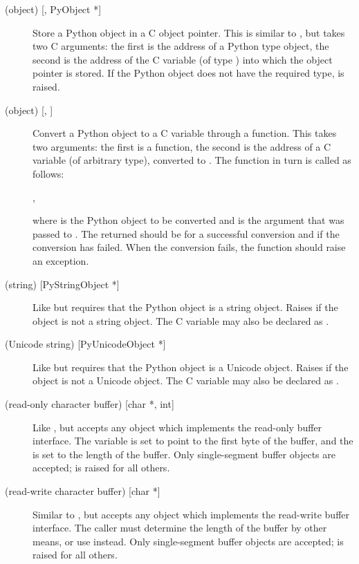 \begin{description}
\item[ (object) {[, PyObject *]}]
Store a Python object in a C object pointer.  This is similar to
, but takes two C arguments: the first is the address of a
Python type object, the second is the address of the C variable (of
type ) into which the object pointer is stored.
If the Python object does not have the required type,
 is raised.

\item[ (object) {[, ]}]
Convert a Python object to a C variable through a 
function.  This takes two arguments: the first is a function, the
second is the address of a C variable (of arbitrary type), converted
to .  The  function in turn is called as
follows:

\code{ = }\code{(}, \code{);}

where  is the Python object to be converted and
 is the  argument that was passed to
.  The returned  should be
 for a successful conversion and  if the conversion
has failed.  When the conversion fails, the  function
should raise an exception.

\item[ (string) {[PyStringObject *]}]
Like  but requires that the Python object is a string object.
Raises  if the object is not a string object.
The C variable may also be declared as .

\item[ (Unicode string) {[PyUnicodeObject *]}]
Like  but requires that the Python object is a Unicode object.
Raises  if the object is not a Unicode object.
The C variable may also be declared as .

\item[ (read-only character buffer) {[char *, int]}]
Like , but accepts any object which implements the read-only 
buffer interface.  The  variable is set to point to the
first byte of the buffer, and the  is set to the length of
the buffer.  Only single-segment buffer objects are accepted;
 is raised for all others.

\item[ (read-write character buffer) {[char *]}]
Similar to , but accepts any object which implements the
read-write buffer interface.  The caller must determine the length of
the buffer by other means, or use  instead.  Only
single-segment buffer objects are accepted;  is
raised for all others.


\end{description}
